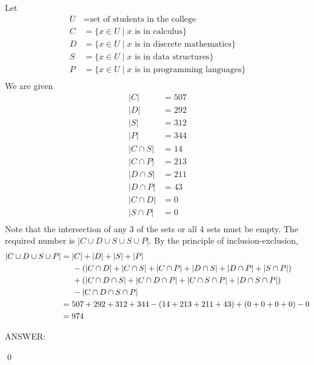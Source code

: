 
Let 
\begin{align*}
U &= \text{set of students in the college} \\
C &= \{ x \in U \mid x \text{ is in calculus} \} \\
D &= \{ x \in U \mid x \text{ is in discrete mathematics} \} \\
S &= \{ x \in U \mid x \text{ is in data structures} \} \\
P &= \{ x \in U \mid x \text{ is in programming languages} \} \\
\end{align*}
We are given
\begin{align*}
|C| &= 507 \\
|D| &= 292 \\
|S| &= 312 \\
|P| &= 344 \\
|C \cap S| &= 14 \\
|C \cap P| &= 213 \\
|D \cap S| &= 211 \\
|D \cap P| &= 43 \\
|C \cap D| &= 0 \\
|S \cap P| &= 0 \\
\end{align*}
Note that the intersection of any 3 of the sets or all 4 sets must be empty.
The required number is $|C \cup D \cup S \cup S \cup P|$.
By the principle of inclusion-exclusion,
\begin{align*}
|C\cup D \cup S \cup P|
&= |C| + |D| + |S| + |P| \\
&\hspace{0.5cm} - (|C \cap D| + |C \cap S| + |C \cap P| + |D \cap S| + |D \cap P| + |S \cap P|) \\
&\hspace{0.5cm} + (|C \cap D \cap S| + |C \cap D \cap P| + |C \cap S \cap P| + |D \cap S \cap P|) \\
&\hspace{0.5cm} - |C \cap D \cap S \cap P| \\
&= 507 + 292 + 312 + 344 - (14 + 213 + 211 + 43) + (0 + 0 + 0 + 0) - 0 \\
&= 974
\end{align*}

ANSWER:

\qed

